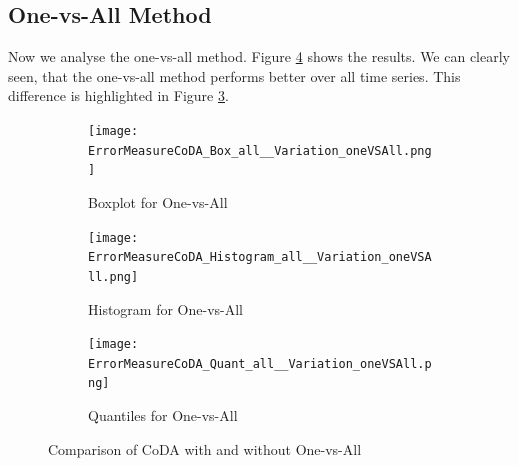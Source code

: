 \subsection{One-vs-All Method}
\label{sec: One-vs-All}

Now we analyse the one-vs-all method. Figure \ref{fig:Coda One-vs-All Comp1} shows the results. We can clearly seen, that the one-vs-all method performs better over all time series. This difference is highlighted in Figure \ref{fig:Coda One-vs-All Quant}. 

\begin{figure}[htb!]
\centering
\begin{subfigure}[b]{0.45\textwidth}
\texttt{[image: ErrorMeasureCoDA\_Box\_all\_\_Variation\_oneVSAll.png]}
\caption{Boxplot for One-vs-All}
\label{fig:Coda One-vs-All Box}
\end{subfigure}
\hfill
\begin{subfigure}[b]{0.45\textwidth}
\texttt{[image: ErrorMeasureCoDA\_Histogram\_all\_\_Variation\_oneVSAll.png]}
\caption{Histogram for One-vs-All}
\label{fig:Coda One-vs-All Hist}
\end{subfigure}
\hfill
\begin{subfigure}[b]{0.8\textwidth}
\texttt{[image: ErrorMeasureCoDA\_Quant\_all\_\_Variation\_oneVSAll.png]}
\caption{Quantiles for One-vs-All}
\label{fig:Coda One-vs-All Quant}
\end{subfigure}
\caption{Comparison of CoDA with and without One-vs-All}
\label{fig:Coda One-vs-All Comp1}
\end{figure}

















